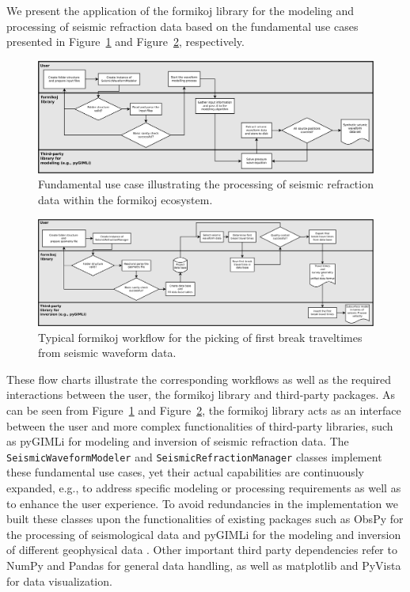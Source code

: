 \documentclass[a4paper,fleqn]{cas-sc}
\begin{document}
We present the application of the formikoj library for the modeling and processing of seismic refraction data based on the fundamental use cases presented in Figure~\ref{fig:modworkflow} and Figure~\ref{fig:procworkflow}, respectively.
\begin{figure}
	\centering
	\includegraphics[width=\textwidth]{figures/workflow_modeling-crop.pdf}
	\caption{Fundamental use case illustrating the processing of seismic refraction data within the formikoj ecosystem.}
	\label{fig:modworkflow}
\end{figure}
\begin{figure}
	\centering
	\includegraphics[width=\textwidth]{figures/workflow_processing-crop.pdf}
	\caption{Typical formikoj workflow for the picking of first break traveltimes from seismic waveform data.}
	\label{fig:procworkflow}
\end{figure}
These flow charts illustrate the corresponding workflows as well as the required interactions between the user, the formikoj library and third-party packages. As can be seen from Figure~\ref{fig:modworkflow} and Figure~\ref{fig:procworkflow}, the formikoj library acts as an interface between the user and more complex functionalities of third-party libraries, such as pyGIMLi for modeling and inversion of seismic refraction data.
The \texttt{SeismicWaveformModeler} and \texttt{SeismicRefractionManager} classes implement these fundamental use cases, yet their actual capabilities are continuously expanded, e.g., to address specific modeling or processing requirements as well as to enhance the user experience. To avoid redundancies in the implementation we built these classes 
upon the functionalities of existing packages such as ObsPy for the processing of seismological data \citep[][]{beyreuther2010} and pyGIMLi for the modeling and inversion of different geophysical data \citep{ruecker2017}. Other important third party dependencies refer to NumPy \citep{harris2020} and Pandas \citep{mckinney2010} for general data handling, as well as matplotlib \citep{hunter2007} and PyVista \citep{sullivan2019} for data visualization.
\end{document}
